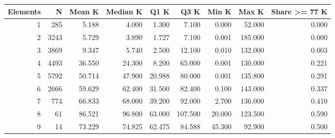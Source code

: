 \begin{tabular}{rrrrrrrrr}
\toprule
Elements & N & Mean K & Median K & Q1 K & Q3 K & Min K & Max K & Share >= 77 K \\
\midrule
1 & 285 & 5.188 & 4.000 & 1.300 & 7.100 & 0.000 & 52.000 & 0.000 \\
2 & 3243 & 5.729 & 3.890 & 1.727 & 7.100 & 0.001 & 185.000 & 0.000 \\
3 & 3869 & 9.347 & 5.740 & 2.500 & 12.100 & 0.010 & 132.000 & 0.003 \\
4 & 4493 & 36.550 & 24.300 & 8.200 & 65.000 & 0.001 & 130.000 & 0.221 \\
5 & 5792 & 50.714 & 47.900 & 20.988 & 80.000 & 0.001 & 135.800 & 0.291 \\
6 & 2666 & 59.629 & 62.400 & 31.500 & 82.400 & 0.100 & 143.000 & 0.337 \\
7 & 774 & 66.833 & 68.000 & 39.200 & 92.000 & 2.700 & 136.000 & 0.410 \\
8 & 61 & 86.521 & 96.800 & 63.000 & 107.500 & 20.000 & 123.500 & 0.590 \\
9 & 14 & 73.229 & 74.825 & 62.475 & 84.588 & 45.300 & 92.900 & 0.500 \\
\bottomrule
\end{tabular}
